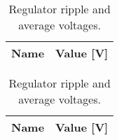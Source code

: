 \begin{table}[h]
        \parbox{.45\linewidth}{
  \centering
  \begin{tabular}{|l|r|}
    \hline
    {\bf Name} & {\bf Value [V]} \\ \hline
    
  \end{tabular}
  \caption{Envelope ripple and average voltages.}
	\label{tab:env}
}
\hfill
        \parbox{.45\linewidth}{
  \centering
  \begin{tabular}{|l|r|}
    \hline
    {\bf Name} & {\bf Value [V]} \\ \hline
    
  \end{tabular}
  \caption{Regulator ripple and average voltages.}
  \label{tab:reg}
}
\end{table}







